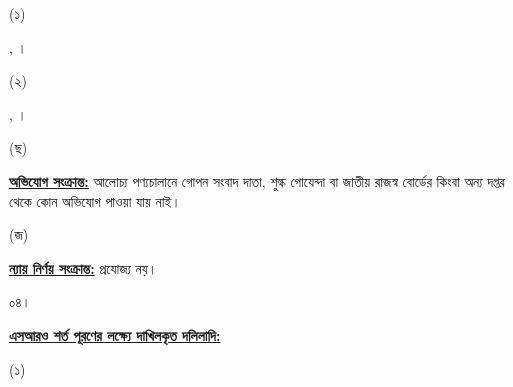 \documentclass[12pt]{article}
\begin{document}
\begin{minipage}[t]{0.05\linewidth}
(১)
\end{minipage}
\begin{minipage}[t]{0.85\linewidth}
{\srooof}, {\srooofd}।
\end{minipage}
\begin{minipage}[t]{0.1\linewidth}
\hspace{1em}
\end{minipage}
\begin{minipage}[t]{0.05\linewidth}
(২)
\end{minipage}
\begin{minipage}[t]{0.85\linewidth}
{\nbrosn}, {\nbrosnd}।
\\
\end{minipage}
\begin{minipage}[t]{0.05\linewidth}
\hspace{1em}
\end{minipage}
\begin{minipage}[t]{0.05\linewidth}
(ছ)
\end{minipage}
\begin{minipage}[t]{0.90\linewidth}
\underline{\textbf{অভিযোগ সংক্রান্ত:}} আলোচ্য পণ্যচালানে
গোপন সংবাদ দাতা, শুল্ক গোযেন্দা বা
জাতীয় রাজস্ব বোর্ডের কিংবা অন্য দপ্তর থেকে
কোন অভিযোগ পাওয়া যায় নাই।
\\
\end{minipage}
\begin{minipage}[t]{0.05\linewidth}
\hspace{1em}
\end{minipage}
\begin{minipage}[t]{0.05\linewidth}
(জ)
\end{minipage}
\begin{minipage}[t]{0.90\linewidth}
\underline{\textbf{ন্যায় নির্ণয় সংক্রান্ত:}} প্রযোজ্য নয়।
\\
\end{minipage}
\begin{minipage}[t]{0.05\linewidth}
০৪।
\end{minipage}
\begin{minipage}[t]{0.95\linewidth}
\underline{\textbf{এসআরও শর্ত পূরণের লক্ষ্যে
দাখিলকৃত দলিলাদি:}}
\end{minipage}
\begin{minipage}[t]{0.05\linewidth}
\hspace{0em}
\end{minipage}
\begin{minipage}[t]{0.05\linewidth}
(১)
\end{minipage}
\end{document}
